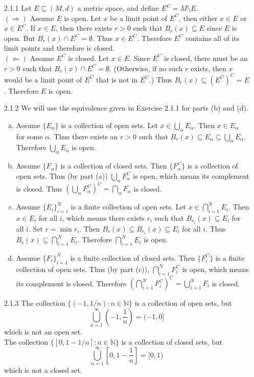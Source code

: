 \documentclass[../../Solutions.tex]{subfiles}
\begin{document}
\begin{itemize}
	\item [2.1.1] Let $E \subseteq (M,d)$ a metric space, and define $E^C = M \setminus E$. \\
		$(\Rightarrow)$ Assume $E$ is open.
		Let $x$ be a limit point of $E^C$, then either $x \in E$ or $x \in E^C$.
		If $x \in E$, then there exists $r > 0$ such that $B_r(x) \subseteq E$ since $E$ is open.
		But $B_r(x) \cap E^C = \emptyset$.
		Thus $x \in E^C$.
		Therefore $E^C$ contains all of its limit points and therefore is closed. \\
		$(\Leftarrow)$ Assume $E^C$ is closed.
		Let $x \in E$.
		Since $E^C$ is closed, there must be an $r > 0$ such that $B_r(x) \cap E^C = \emptyset$.
		(Otherwise, if no such $r$ exists, then $x$ would be a limit point of $E^C$ that is not in $E^C$.)
		Thus $B_r(x) \subseteq \left(E^C\right)^C = E$.
		Therefore $E$ is open.
	
	\item [2.1.2] We will use the equivalence given in Exercise 2.1.1 for parts (b) and (d).
	\begin{enumerate}[(a)]
		\item Assume $\{E_\alpha\}$ is a collection of open sets.
			Let $x \in \bigcup_\alpha E_\alpha$.
			Then $x \in E_\alpha$ for some $\alpha$.
			Thus there exists an $r > 0$ such that $B_r(x) \subseteq E_\alpha \subseteq \bigcup_\alpha E_\alpha$.
			Therefore $\bigcup_\alpha E_\alpha$ is open.
		\item Assume $\{F_\alpha\}$ is a collection of closed sets.
			Then $\{F_\alpha^C\}$ is a collection of open sets.
			Thus (by part (a)) $\bigcup_\alpha F_\alpha^C$ is open, which means its complement is closed.
			Thus $\left(\bigcup_\alpha F_\alpha^C\right)^C = \bigcap_\alpha F_\alpha$ is closed.
		\item Assume $\{E_i\}_{i=1}^N$ is a finite collection of open sets.
			Let $x \in \bigcap_{i=1}^N E_i$.
			Then $x \in E_i$ for all $i$, which means there exists $r_i$ such that $B_{r_i}(x) \subseteq E_i$ for all $i$.
			Set $r = \min{r_i}$.
			Then $B_r(x) \subseteq B_{r_i}(x) \subseteq E_i$ for all $i$.
			Thus $B_r(x) \subseteq \bigcap_{i=1}^N E_i$.
			Therefore $\bigcap_{i=1}^N E_i$ is open.
		\item Assume $\{F_i\}_{i=1}^N$ is a finite collection of closed sets.
			Then $\{F_i^C\}$ is a finite collection of open sets.
			Thus (by part (c)), $\bigcap_{i=1}^N F_i^C$ is open, which means its complement is closed.
			Therefore $\left(\bigcap_{i=1}^N F_i^C\right)^C = \bigcup_{i=1}^N F_i$ is closed.
	\end{enumerate}
	
	\item [2.1.3] The collection $\{(-1,1/n) : n \in \mathbb{N} \}$ is a collection of open sets, but
		$$ \bigcup_{n=1}^\infty \left(-1,\frac{1}{n}\right) = (-1,0] $$
		which is not an open set. \\
		The collection $\{[0,1-1/n] : n \in \mathbb{N} \}$ is a collection of closed sets, but
		$$ \bigcup_{n=1}^\infty \left[0,1-\frac{1}{n}\right] = [0,1) $$
		which is not a closed set.
\end{itemize}
\end{document}
